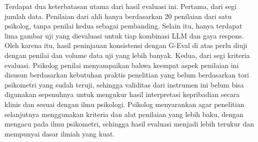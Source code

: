 Terdapat dua keterbatasan utama dari hasil evaluasi ini. Pertama, dari segi jumlah data. Penilaian dari ahli hanya berdasarkan 20 penilaian dari satu psikolog, tanpa penilai kedua sebagai pembanding. Selain itu, hanya terdapat lima gambar uji yang dievaluasi untuk tiap kombinasi LLM dan gaya respons. Oleh karena itu, hasil peninjauan konsistensi dengan G-Eval di atas perlu diuji dengan penilai dan volume data uji yang lebih banyak. Kedua, dari segi kriteria evaluasi. Psikolog penilai menyampaikan bahwa keempat aspek penilaian ini disusun berdasarkan kebutuhan praktis penelitian yang belum berdasarkan tori psikometri yang sudah teruji, sehingga validitas dari instrumen ini belum bisa digunakan sepenuhnya untuk mengukur hasil interpretasi kepribadian secara klinis dan sesuai dengan ilmu psikologi. Psikolog menyarankan agar penelitian selanjutnya menggunakan kriteria dan alat penilaian yang lebih baku, dengan mengacu pada ilmu psikometri, sehingga hasil evaluasi menjadi lebih terukur dan mempunyai dasar ilmiah yang kuat.


